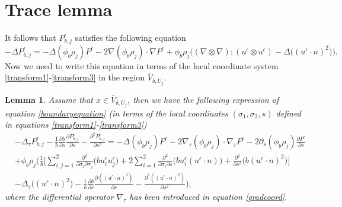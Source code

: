 \documentclass[12pt,a4paper]{article}
\newtheorem{lemma}[theorem]{Lemma}
\theoremstyle{definition}
\theoremstyle{remark}
\numberwithin{equation}{section}
\begin{document}
\section{Trace lemma} \label{tracesection}
It follows that $P_{b,j}^\epsilon$ satisfies the following equation
\begingroup
\allowdisplaybreaks
\begin{equation} \label{boundaryequation}
-\Delta P^\epsilon_{b,j} = - \Delta (\phi_b \rho_j) P^\epsilon - 2  \nabla (\phi_b \rho_j) \cdot \nabla P^\epsilon + \phi_b \rho_j \bigg((\nabla \otimes \nabla) : (u^\epsilon \otimes u^\epsilon) - \Delta \big( (u^\epsilon \cdot n)^2 \big)  \bigg).
\end{equation}
\endgroup
Now we need to write this equation in terms of the local coordinate system \eqref{transform1}-\eqref{transform3} in the region $\overline{V}_{\delta, U_j}$.
\begin{lemma}
Assume that $x \in \overline{V}_{\delta, U_j}$, then we have the following expression of equation \eqref{boundaryequation} (in terms of the local coordinates $(\sigma_1, \sigma_2, s)$ defined in equations \eqref{transform1}-\eqref{transform3})
\begin{align}
&-\Delta_\tau P^\epsilon_{b,j} - \frac{1}{b} \frac{\partial b}{\partial s} \frac{\partial P^\epsilon_{b,j}}{\partial s} - \frac{\partial^2 P^\epsilon_{b,j}}{\partial s^2} = - \Delta (\phi_b \rho_j) P^\epsilon - 2 \nabla_\tau (\phi_b \rho_j) \cdot \nabla_\tau P^\epsilon - 2 \partial_s (\phi_b \rho_j) \frac{\partial P^\epsilon}{\partial s} \nonumber \\
&+ \phi_b \rho_j \bigg( \frac{1}{b} \bigg[ \sum_{i,j=1}^2 \frac{\partial^2}{\partial \sigma_i \partial \sigma_j} \big( b u^\epsilon_i u^\epsilon_j \big) + 2 \sum_{i=1}^2 \frac{\partial^2}{\partial \sigma_i \partial s} \big( b u^\epsilon_i (u^\epsilon \cdot n) \big) + \frac{\partial^2}{\partial s^2} \big( b (u^\epsilon \cdot n)^2 \big) \bigg] \nonumber \\
&- \Delta_\tau \big( (u^\epsilon \cdot n)^2 \big) - \frac{1}{b} \frac{\partial b}{\partial s} \frac{\partial ( (u^\epsilon \cdot n)^2)}{\partial s} - \frac{\partial^2 ( (u^\epsilon \cdot n)^2)}{\partial s^2} \bigg), \label{boundaryeqcoords}
\end{align}
where the differential operator $\nabla_\tau$ has been introduced in equation \eqref{gradcoord}.
\end{lemma}
\end{document}
